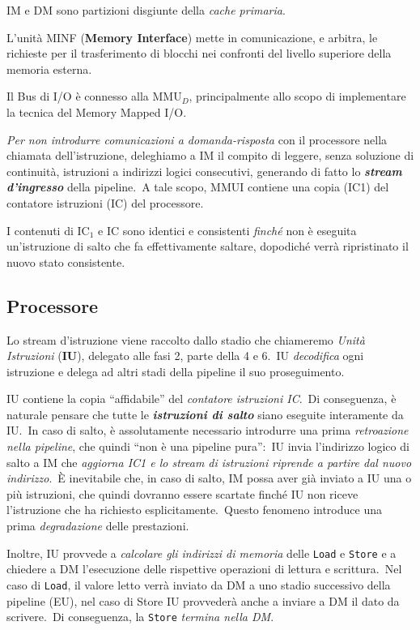 IM e DM sono partizioni disgiunte della \textit{cache primaria}.

L'unità MINF (\textbf{Memory Interface}) mette in comunicazione, e arbitra, le richieste per il trasferimento di blocchi nei confronti del livello superiore della memoria esterna.

Il Bus di I/O è connesso alla $\mathrm{MMU}_D$, principalmente allo scopo di implementare la tecnica del Memory Mapped I/O.

\textit{Per non introdurre comunicazioni a domanda-risposta} con il processore nella chiamata dell'istruzione, deleghiamo a IM il compito di leggere, senza soluzione di continuità, istruzioni a indirizzi logici consecutivi, generando di fatto lo \textbf{\textit{stream d'ingresso}} della pipeline.\
A tale scopo, MMUI contiene una copia (IC1) del contatore istruzioni (IC) del processore.

I contenuti di $\mathrm{IC}_1$ e IC sono identici e consistenti \textit{finché} non è eseguita un'istruzione di salto che fa effettivamente saltare, dopodiché verrà ripristinato il nuovo stato consistente.

\subsection{Processore}

Lo stream d'istruzione viene raccolto dallo stadio che chiameremo \textit{Unità Istruzioni} (\textbf{IU}), delegato alle fasi 2, parte della 4 e 6.\
IU \textit{decodifica} ogni istruzione e delega ad altri stadi della pipeline il suo proseguimento.

IU contiene la copia ``affidabile'' del \textit{contatore istruzioni IC}.\
Di conseguenza, è naturale pensare che tutte le \textbf{\textit{istruzioni di salto}} siano eseguite interamente da IU.\
In caso di salto, è assolutamente necessario introdurre una prima \textit{retroazione nella pipeline}, che quindi ``non è una pipeline pura'':\ IU invia l'indirizzo logico di salto a IM che \textit{aggiorna IC1 e lo stream di istruzioni riprende a partire dal nuovo indirizzo}.\
È inevitabile che, in caso di salto, IM possa aver già inviato a IU una o più istruzioni, che quindi dovranno essere scartate finché IU non riceve l'istruzione che ha richiesto esplicitamente.\
Questo fenomeno introduce una prima \textit{degradazione} delle prestazioni.

Inoltre, IU provvede a \textit{calcolare gli indirizzi di memoria} delle \texttt{Load} e \texttt{Store} e a chiedere a DM l'esecuzione delle rispettive operazioni di lettura e scrittura.\
Nel caso di \texttt{Load}, il valore letto verrà inviato da DM a uno stadio successivo della pipeline (EU), nel caso di Store IU provvederà anche a inviare a DM il dato da scrivere.\
Di conseguenza, la \texttt{Store} \textit{termina nella DM}.


